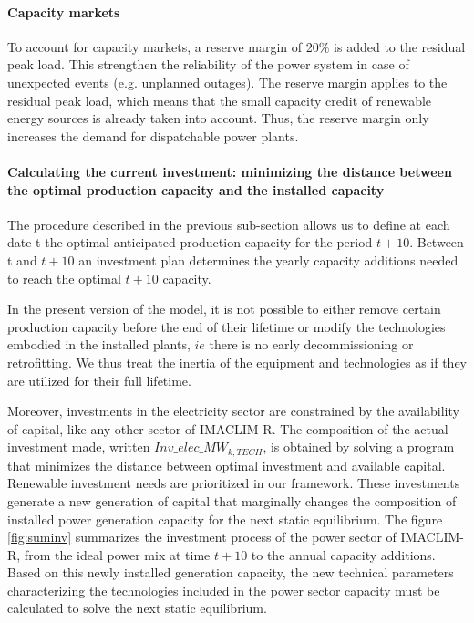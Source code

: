 { \paragraph{Capacity markets}
 
To account for capacity markets, a reserve margin of 20\% is added to the residual peak load. This strengthen the reliability of the power system in case of unexpected events (e.g. unplanned outages). The reserve margin applies to the residual peak load, which means that the small capacity credit of renewable energy sources is already taken into account. Thus, the reserve margin only increases the demand for dispatchable power plants.

\paragraph{Calculating the current investment: minimizing the distance between the optimal production capacity and the installed capacity}

The procedure described in the previous sub-section allows us to define at each date t the optimal anticipated production capacity for the period $t+10$. Between t and $t+10$ an investment plan determines the yearly capacity additions needed to reach the optimal $t+10$ capacity.

In the present version of the model, it is not possible to either remove certain production capacity before the end of their lifetime or modify the technologies embodied in the installed plants, $ie$ there is no early decommissioning or retrofitting. We thus treat the inertia of the equipment and technologies as if they are utilized for their full lifetime.

Moreover, investments in the electricity sector are constrained by the availability of capital, like any other sector of IMACLIM-R. The composition of the actual investment made, written $Inv\_elec\_MW_{k,TECH}$, is obtained by solving a program that minimizes the distance between optimal investment and available capital. Renewable investment needs are prioritized in our framework.
These investments generate a new generation of capital that marginally changes the composition of installed power generation capacity for the next static equilibrium. The figure \ref{fig:suminv} summarizes the investment process of the power sector of IMACLIM-R, from the ideal power mix at time $t+10$ to the annual capacity additions.
Based on this newly installed generation capacity, the new technical parameters characterizing the technologies included in the power sector capacity must be calculated to solve the next static equilibrium.

}
